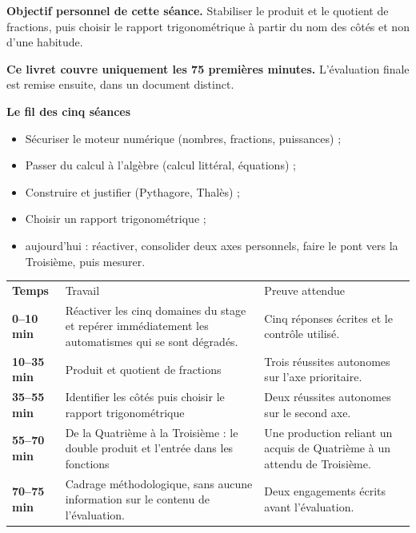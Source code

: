 \documentclass[10pt,a4paper]{article}
\begin{document}
\begin{goalbox}
\textbf{Objectif personnel de cette séance.} Stabiliser le produit et le quotient de fractions, puis choisir le rapport trigonométrique à partir du nom des côtés et non d'une habitude.
\par\medskip
\textbf{Ce livret couvre uniquement les 75 premières minutes.} L'évaluation finale est remise ensuite, dans un document distinct.
\end{goalbox}
\begin{methodbox}
\textbf{Le fil des cinq séances}
\begin{itemize}[leftmargin=13mm,labelsep=3mm,itemsep=1.5pt]
\item[\textbf{\color{Navy}S1}] Sécuriser le moteur numérique (nombres, fractions, puissances) ;
\item[\textbf{\color{Navy}S2}] Passer du calcul à l'algèbre (calcul littéral, équations) ;
\item[\textbf{\color{Navy}S3}] Construire et justifier (Pythagore, Thalès) ;
\item[\textbf{\color{Navy}S4}] Choisir un rapport trigonométrique ;
\item[\textbf{\color{Navy}S5}] aujourd'hui : réactiver, consolider deux axes personnels, faire le pont vers la Troisième, puis mesurer.
\end{itemize}
\end{methodbox}
\par\noindent\begin{tabularx}{\linewidth}{>{\bfseries}p{20mm} X X}
\rowcolor{Navy}\color{white}Temps & \color{white}Travail & \color{white}Preuve attendue \\
0--10 min & Réactiver les cinq domaines du stage et repérer immédiatement les automatismes qui se sont dégradés. & Cinq réponses écrites et le contrôle utilisé. \\
10--35 min & Produit et quotient de fractions & Trois réussites autonomes sur l'axe prioritaire. \\
35--55 min & Identifier les côtés puis choisir le rapport trigonométrique & Deux réussites autonomes sur le second axe. \\
55--70 min & De la Quatrième à la Troisième : le double produit et l'entrée dans les fonctions & Une production reliant un acquis de Quatrième à un attendu de Troisième. \\
70--75 min & Cadrage méthodologique, sans aucune information sur le contenu de l'évaluation. & Deux engagements écrits avant l'évaluation. \\
\end{tabularx}
\end{document}
